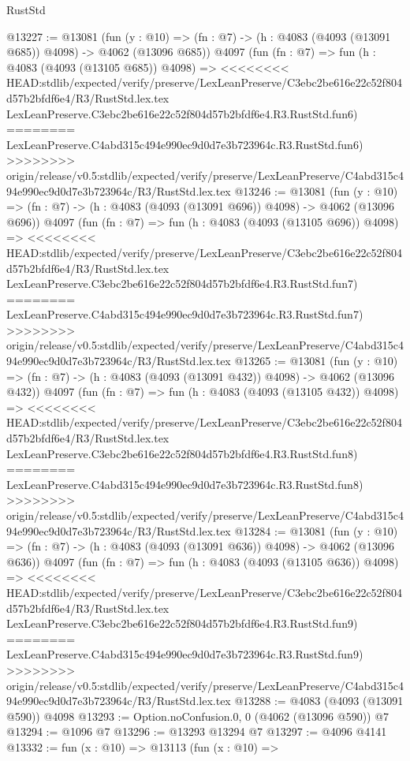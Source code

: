 \begin{lexlean}{RustStd}
\begin{coremodule}
{\begin{coremodule}
{{{{{{{{{{{{{{@13227 := @13081
    (fun (y : @10) => (fn : @7) -> (h : @4083 (@4093 (@13091 @685)) @4098) -> @4062 (@13096 @685))
    @4097
    (fun (fn : @7) =>
    fun (h : @4083 (@4093 (@13105 @685)) @4098) =>
<<<<<<<< HEAD:stdlib/expected/verify/preserve/LexLeanPreserve/C3ebc2be616e22c52f804d57b2bfdf6e4/R3/RustStd.lex.tex
    LexLeanPreserve.C3ebc2be616e22c52f804d57b2bfdf6e4.R3.RustStd.fun6)
========
    LexLeanPreserve.C4abd315c494e990ec9d0d7e3b723964c.R3.RustStd.fun6)
>>>>>>>> origin/release/v0.5:stdlib/expected/verify/preserve/LexLeanPreserve/C4abd315c494e990ec9d0d7e3b723964c/R3/RustStd.lex.tex
@13246 := @13081
    (fun (y : @10) => (fn : @7) -> (h : @4083 (@4093 (@13091 @696)) @4098) -> @4062 (@13096 @696))
    @4097
    (fun (fn : @7) =>
    fun (h : @4083 (@4093 (@13105 @696)) @4098) =>
<<<<<<<< HEAD:stdlib/expected/verify/preserve/LexLeanPreserve/C3ebc2be616e22c52f804d57b2bfdf6e4/R3/RustStd.lex.tex
    LexLeanPreserve.C3ebc2be616e22c52f804d57b2bfdf6e4.R3.RustStd.fun7)
========
    LexLeanPreserve.C4abd315c494e990ec9d0d7e3b723964c.R3.RustStd.fun7)
>>>>>>>> origin/release/v0.5:stdlib/expected/verify/preserve/LexLeanPreserve/C4abd315c494e990ec9d0d7e3b723964c/R3/RustStd.lex.tex
@13265 := @13081
    (fun (y : @10) => (fn : @7) -> (h : @4083 (@4093 (@13091 @432)) @4098) -> @4062 (@13096 @432))
    @4097
    (fun (fn : @7) =>
    fun (h : @4083 (@4093 (@13105 @432)) @4098) =>
<<<<<<<< HEAD:stdlib/expected/verify/preserve/LexLeanPreserve/C3ebc2be616e22c52f804d57b2bfdf6e4/R3/RustStd.lex.tex
    LexLeanPreserve.C3ebc2be616e22c52f804d57b2bfdf6e4.R3.RustStd.fun8)
========
    LexLeanPreserve.C4abd315c494e990ec9d0d7e3b723964c.R3.RustStd.fun8)
>>>>>>>> origin/release/v0.5:stdlib/expected/verify/preserve/LexLeanPreserve/C4abd315c494e990ec9d0d7e3b723964c/R3/RustStd.lex.tex
@13284 := @13081
    (fun (y : @10) => (fn : @7) -> (h : @4083 (@4093 (@13091 @636)) @4098) -> @4062 (@13096 @636))
    @4097
    (fun (fn : @7) =>
    fun (h : @4083 (@4093 (@13105 @636)) @4098) =>
<<<<<<<< HEAD:stdlib/expected/verify/preserve/LexLeanPreserve/C3ebc2be616e22c52f804d57b2bfdf6e4/R3/RustStd.lex.tex
    LexLeanPreserve.C3ebc2be616e22c52f804d57b2bfdf6e4.R3.RustStd.fun9)
========
    LexLeanPreserve.C4abd315c494e990ec9d0d7e3b723964c.R3.RustStd.fun9)
>>>>>>>> origin/release/v0.5:stdlib/expected/verify/preserve/LexLeanPreserve/C4abd315c494e990ec9d0d7e3b723964c/R3/RustStd.lex.tex
@13288 := @4083 (@4093 (@13091 @590)) @4098
@13293 := Option.noConfusion.{0, 0} (@4062 (@13096 @590)) @7
@13294 := @1096 @7
@13296 := @13293 @13294 @7
@13297 := @4096 @4141
@13332 := fun (x : @10) =>
  @13113
    (fun (x : @10) =>
}}}}}}}}}}}}}}
\end{coremodule}}
\end{coremodule}
\end{lexlean}
